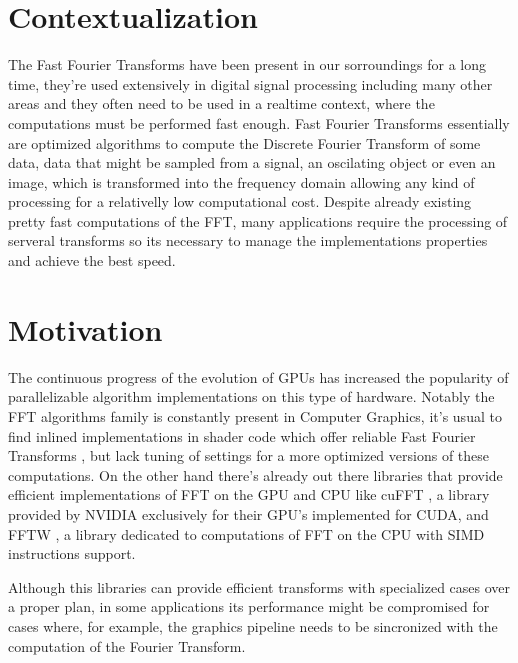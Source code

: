 \documentclass[
  oneside,
  11pt, a4paper,
  footinclude=true,
  headinclude=true,
  cleardoublepage=empty
]{scrbook}
\begin{document}
\section{Contextualization} \label{sec:contextualization}

The Fast Fourier Transforms have been present in our sorroundings for a long time, they're used extensively in digital signal processing including many other areas and they often need to be used in a realtime context, where the computations must be performed fast enough. Fast Fourier Transforms essentially are optimized algorithms to compute the Discrete Fourier Transform of some data, data that might be sampled from a signal, an oscilating object or even an image, which is transformed into the frequency domain allowing any kind of processing for a relativelly low computational cost. Despite already existing pretty fast computations of the FFT, many applications require the processing of serveral transforms so its necessary to manage the implementations properties and achieve the best speed.


\section{Motivation} \label{sec:motivation}

The continuous progress of the evolution of GPUs has increased the popularity of parallelizable algorithm implementations on this type of hardware.
Notably the FFT algorithms family is constantly present in Computer Graphics, it's usual to find inlined implementations in shader code which offer reliable Fast Fourier Transforms \cite{flugge2017realtime}, but lack tuning of settings for a more optimized versions of these computations. On the other hand there's already out there libraries that provide efficient implementations of FFT on the GPU and CPU like cuFFT \cite{nvidiacufft}, a library provided by NVIDIA exclusively for their GPU's implemented for CUDA, and FFTW \cite{frigo2012fftw}, a library dedicated to computations of FFT on the CPU with SIMD instructions support.

Although this libraries can provide efficient transforms with specialized cases over a proper plan, in some applications its performance might be compromised for cases where, for example, the graphics pipeline needs to be sincronized with the computation of the Fourier Transform.
\end{document}
